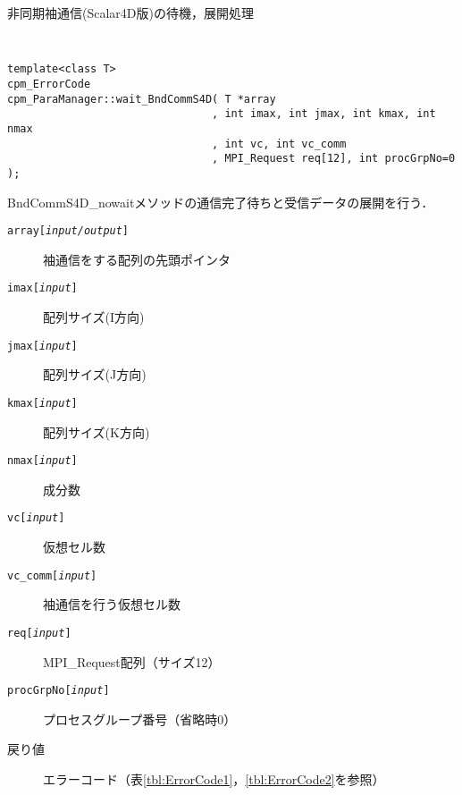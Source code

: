 \begin{spacing}{0.8}
\begin{itembox}[l]{非同期袖通信(Scalar4D版)の待機，展開処理}
{\tt
\begin{verbatim}
template<class T>
cpm_ErrorCode
cpm_ParaManager::wait_BndCommS4D( T *array
                                , int imax, int jmax, int kmax, int nmax
                                , int vc, int vc_comm
                                , MPI_Request req[12], int procGrpNo=0 );
\end{verbatim}
}
BndCommS4D\_nowaitメソッドの通信完了待ちと受信データの展開を行う．
\begin{description}
\item[{\tt array[{\it input/output}]}] 袖通信をする配列の先頭ポインタ
\item[{\tt imax[{\it input}]}] 配列サイズ(I方向)
\item[{\tt jmax[{\it input}]}] 配列サイズ(J方向)
\item[{\tt kmax[{\it input}]}] 配列サイズ(K方向)
\item[{\tt nmax[{\it input}]}] 成分数
\item[{\tt vc[{\it input}]}] 仮想セル数
\item[{\tt vc\_comm[{\it input}]}] 袖通信を行う仮想セル数
\item[{\tt req[{\it input}]}] MPI\_Request配列（サイズ12）
\item[{\tt procGrpNo[{\it input}]}] プロセスグループ番号（省略時0）
\\
\item[戻り値] エラーコード（表\ref{tbl:ErrorCode1}，\ref{tbl:ErrorCode2}を参照）
\end{description}
\end{itembox}\\
\end{spacing}


